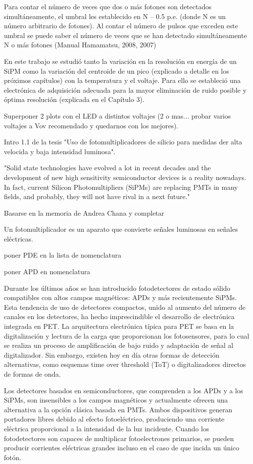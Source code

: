 Para contar el número de veces que dos o más fotones son detectados simultáneamente, el umbral les establecido en N – 0.5 p.e. (donde N es un número arbitrario de fotones). Al contar el número de pulsos que exceden este umbral se puede saber el número de veces que se han detectado simultáneamente N o más fotones (Manual Hamamatsu, 2008, 2007)

En este trabajo se estudió tanto la variación en la resolución en energía de un SiPM como la variación del centroide de un pico (explicado a detalle en los próximos capítulos) con la temperatura y el voltaje. Para ello se estableció una electrónica de adquisición adecuada para la mayor eliminación de ruido posible y óptima resolución (explicada en el Capítulo 3).


Superponer 2 plots con el LED a distintos voltajes (2 o mas... probar varios voltajes a Vov recomendado y quedarnos con los mejores).

Intro 1.1 de la tesis "Uso de fotomultiplicadores de silicio para medidas der alta velocida y baja intensidad luminosa".

"Solid state technologies have evolved a lot in recent decades and the development of new high sensitivity semiconductor devices is a reality nowadays. In fact, current Silicon Photomultipliers (SiPMs) are replacing PMTs in many fields, and probably, they will not have rival in a next future."

Basarse en la memoria de Andrea Chana y completar

Un fotomultiplicador es un aparato que convierte señales luminosas en señales eléctricas.

poner PDE en la lista de nomenclatura

poner APD en nomenclatura

Durante los últimos años se han introducido fotodetectores de estado sólido compatibles con altos campos magnéticos: APDs y más recientemente SiPMs. Esta tendencia de uso de detectores compactos, unido al aumento del número de canales en los detectores, ha hecho imprescindible el desarrollo de electrónica integrada en PET. La arquitectura electrónica típica para PET se basa en la digitalización y lectura de la carga que proporcionan los fotosensores, para lo cual se realiza un proceso de amplificación de bajo ruido y adaptación de señal al digitalizador. Sin embargo, existen hoy en día otras formas de detección alternativas, como esquemas time over threshold (ToT) o digitalizadores directos de formas de onda.

Los detectores basados en semiconductores, que comprenden a los APDs y a los SiPMs, son insensibles a los campos magnéticos y actualmente ofrecen una alternativa a la opción clásica basada en PMTs. Ambos dispositivos generan portadores libres debido al efecto fotoeléctrico, produciendo una corriente eléctrica proporcional a la intensidad de la luz incidente. Cuando los fotodetectores son capaces de multiplicar fotoelectrones primarios, se pueden producir corrientes eléctricas grandes incluso en el caso de que incida un único fotón.

